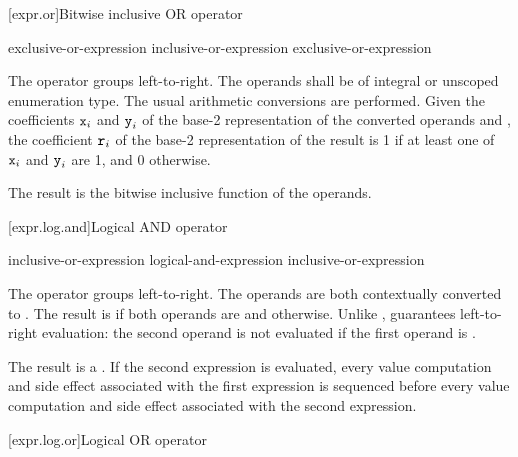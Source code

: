 [expr.or]{Bitwise inclusive OR operator}%
%
%

\begin{bnf}
\br
    exclusive-or-expression\br
    inclusive-or-expression \terminal{|} exclusive-or-expression
\end{bnf}

\pnum
The \tcode{|} operator groups left-to-right.
The operands shall be of integral or unscoped enumeration type.
The usual arithmetic conversions are performed.
Given the coefficients $\texttt{x}_i$ and $\texttt{y}_i$
of the base-2 representation
of the converted operands  and ,
the coefficient $\texttt{r}_i$
of the base-2 representation of the result 
is 1 if at least one of $\texttt{x}_i$ and $\texttt{y}_i$ are 1, and 0 otherwise.
\begin{note}
The result is the bitwise inclusive  function of the operands.
\end{note}

[expr.log.and]{Logical AND operator}%
%
%
%

\begin{bnf}
\br
    inclusive-or-expression\br
    logical-and-expression \terminal{\&\&} inclusive-or-expression
\end{bnf}

\pnum
The \tcode{\&\&} operator groups left-to-right. The operands are both
contextually converted to .
The
result is  if both operands are  and
 otherwise. Unlike \tcode{\&}, \tcode{\&\&} guarantees
left-to-right evaluation: the second operand is not evaluated if the
first operand is .

\pnum
The result is a .
%
If the second expression is evaluated, every
%
value computation and
side
effect associated with the first expression is sequenced before every
value computation and side effect associated with the second expression.

[expr.log.or]{Logical OR operator}%
%
%
%

